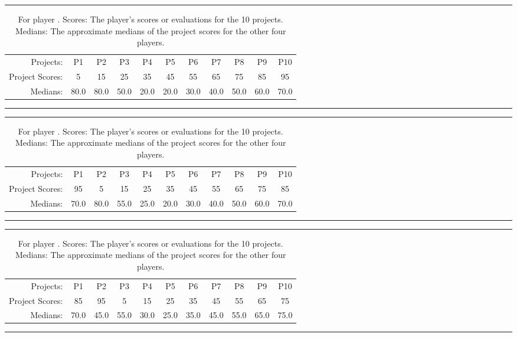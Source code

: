 \documentclass[11pt, oneside]{article}   	%
\begin{document}
\ifnum{}
\begin{table}[h]
\centering
\rule{\textwidth}{1pt}
\begin{tabular}{r|cccccccccc}
Projects: & P1 & P2 & P3 & P4 & P5 & P6 & P7 & P8 & P9 & P10 \\
Project Scores: & 5 & 15 & 25 & 35 & 45 & 55 & 65 & 75 & 85 & 95 \\
Medians: &80.0 & 80.0 & 50.0 & 20.0 & 20.0 & 30.0 & 40.0 & 50.0 & 60.0 & 70.0 \\
\end{tabular}
\caption{For player \theplayer . Scores: The player's scores or evaluations for the 10 projects. Medians: The approximate medians of the project scores for the other four players.}
\label{fig:scores}
\rule{\textwidth}{1pt}
\end{table}
\fi
\ifnum{}
\begin{table}[h]
\centering
\rule{\textwidth}{1pt}
\begin{tabular}{r|cccccccccc}
Projects: & P1 & P2 & P3 & P4 & P5 & P6 & P7 & P8 & P9 & P10 \\
Project Scores: & 95 & 5 & 15 & 25 & 35 & 45 & 55 & 65 & 75 & 85 \\
Medians: &70.0 & 80.0 & 55.0 & 25.0 & 20.0 & 30.0 & 40.0 & 50.0 & 60.0 & 70.0 \\
\end{tabular}
\caption{For player \theplayer . Scores: The player's scores or evaluations for the 10 projects. Medians: The approximate medians of the project scores for the other four players.}
\label{fig:scores}
\rule{\textwidth}{1pt}
\end{table}
\fi
\ifnum{}
\begin{table}[h]
\centering
\rule{\textwidth}{1pt}
\begin{tabular}{r|cccccccccc}
Projects: & P1 & P2 & P3 & P4 & P5 & P6 & P7 & P8 & P9 & P10 \\
Project Scores: & 85 & 95 & 5 & 15 & 25 & 35 & 45 & 55 & 65 & 75 \\
Medians: &70.0 & 45.0 & 55.0 & 30.0 & 25.0 & 35.0 & 45.0 & 55.0 & 65.0 & 75.0 \\
\end{tabular}
\caption{For player \theplayer . Scores: The player's scores or evaluations for the 10 projects. Medians: The approximate medians of the project scores for the other four players.}
\label{fig:scores}
\rule{\textwidth}{1pt}
\end{table}
\end{document}
